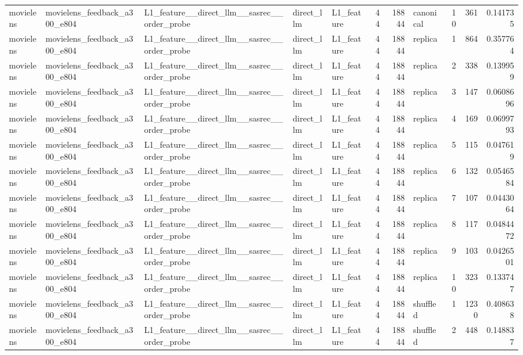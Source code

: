 \begin{table}[htbp!]
\begin{tabular}{lllllrrlrrr}
movielens & movielens\_feedback\_a300\_e804 & L1\_feature\_\_direct\_llm\_\_sasrec\_\_order\_probe & direct\_llm & L1\_feature & 44 & 18844 & canonical & 10 & 361 & 0.141735 \\
movielens & movielens\_feedback\_a300\_e804 & L1\_feature\_\_direct\_llm\_\_sasrec\_\_order\_probe & direct\_llm & L1\_feature & 44 & 18844 & replica & 1 & 864 & 0.357764 \\
movielens & movielens\_feedback\_a300\_e804 & L1\_feature\_\_direct\_llm\_\_sasrec\_\_order\_probe & direct\_llm & L1\_feature & 44 & 18844 & replica & 2 & 338 & 0.139959 \\
movielens & movielens\_feedback\_a300\_e804 & L1\_feature\_\_direct\_llm\_\_sasrec\_\_order\_probe & direct\_llm & L1\_feature & 44 & 18844 & replica & 3 & 147 & 0.0608696 \\
movielens & movielens\_feedback\_a300\_e804 & L1\_feature\_\_direct\_llm\_\_sasrec\_\_order\_probe & direct\_llm & L1\_feature & 44 & 18844 & replica & 4 & 169 & 0.0699793 \\
movielens & movielens\_feedback\_a300\_e804 & L1\_feature\_\_direct\_llm\_\_sasrec\_\_order\_probe & direct\_llm & L1\_feature & 44 & 18844 & replica & 5 & 115 & 0.047619 \\
movielens & movielens\_feedback\_a300\_e804 & L1\_feature\_\_direct\_llm\_\_sasrec\_\_order\_probe & direct\_llm & L1\_feature & 44 & 18844 & replica & 6 & 132 & 0.0546584 \\
movielens & movielens\_feedback\_a300\_e804 & L1\_feature\_\_direct\_llm\_\_sasrec\_\_order\_probe & direct\_llm & L1\_feature & 44 & 18844 & replica & 7 & 107 & 0.0443064 \\
movielens & movielens\_feedback\_a300\_e804 & L1\_feature\_\_direct\_llm\_\_sasrec\_\_order\_probe & direct\_llm & L1\_feature & 44 & 18844 & replica & 8 & 117 & 0.0484472 \\
movielens & movielens\_feedback\_a300\_e804 & L1\_feature\_\_direct\_llm\_\_sasrec\_\_order\_probe & direct\_llm & L1\_feature & 44 & 18844 & replica & 9 & 103 & 0.0426501 \\
movielens & movielens\_feedback\_a300\_e804 & L1\_feature\_\_direct\_llm\_\_sasrec\_\_order\_probe & direct\_llm & L1\_feature & 44 & 18844 & replica & 10 & 323 & 0.133747 \\
movielens & movielens\_feedback\_a300\_e804 & L1\_feature\_\_direct\_llm\_\_sasrec\_\_order\_probe & direct\_llm & L1\_feature & 44 & 18844 & shuffled & 1 & 1230 & 0.408638 \\
movielens & movielens\_feedback\_a300\_e804 & L1\_feature\_\_direct\_llm\_\_sasrec\_\_order\_probe & direct\_llm & L1\_feature & 44 & 18844 & shuffled & 2 & 448 & 0.148837 \\

\end{tabular}
\end{table}
